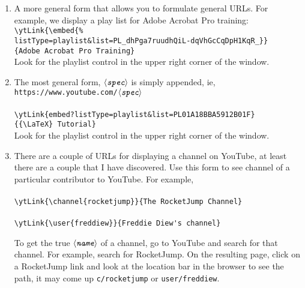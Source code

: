 \documentclass{article}
\def\ameta#1{$\langle\textit{\texttt{#1}}\rangle$}
\newcommand{\YT}{\textsf{YouTube}}
\begin{document}
\begin{enumerate}
  \item[\ding{184}] A more general form that allows you to formulate general URLs. For example, we display
    a play list for Adobe Acrobat Pro training:\goodbreak
    \\
    \verb!\ytLink{\embed{%!\\
    \null\qquad\verb!listType=playlist&list=PL_dhPga7ruudhQiL-dqVhGcCqDpH1KqR_}}!\\
    \null\qquad\verb!{Adobe Acrobat Pro Training}!\\[3pt]
  Look for the playlist control in the upper right corner of the window.
  \item[\ding{185}] The most general form, \ameta{spec} is simply appended, ie,
  \texttt{https://www.youtube.com/\ameta{spec}}\\[3pt]
  \\
  \verb|\ytLink{embed?listType=playlist&list=PL01A18BBA5912B01F}|\\
  \null\qquad\verb|{{\LaTeX} Tutorial}|\\[3pt]
  Look for the playlist control in the upper right corner of the window.
  \item[\ding{186}] There are a couple of URLs for displaying a channel on \YT, at least there are a couple
  that I have discovered.
  Use this form to see channel of a particular contributor to {\YT}. For example,\\[3pt]
  \\
  \verb|\ytLink{\channel{rocketjump}}{The RocketJump Channel}|\\[3pt]
  \\
  \verb|\ytLink{\user{freddiew}}{Freddie Diew's channel}|

  To get the true \ameta{name} of a channel, go to {\YT} and search for that channel. For example,
  search for \textsf{RocketJump}. On the resulting page, click on a RocketJump link and look at the
  location bar in the browser to see the path, it may come up \texttt{c/rocketjump} or \texttt{user/freddiew}.


\end{enumerate}
\end{document}
